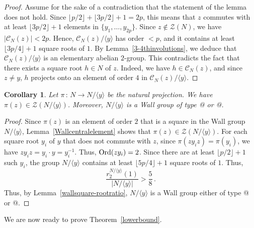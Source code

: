 \documentclass[12pt]{amsart}
\makeatletter
\numberwithin{equation}{section}
\newcommand*{\rom}[1]{\expandafter\@slowromancap\romannumeral #1@}
\newcommand{\Ord}{{\rm Ord}}
\newtheorem{cor}[X]{Corollary}
\theoremstyle{definition}
\theoremstyle{remark}
\makeatother
\begin{document}
\begin{proof}
    Assume for the sake of a contradiction that the statement of the lemma does not hold. Since $\lfloor p/2\rfloor+\lfloor 3p/2\rfloor+1=2p$, this means that $z$ commutes with at least $\lfloor 3p/2\rfloor+1$ elements in $\{y_1,\dots,y_{2p}\}$. Since $z\notin\mathcal{Z}(N)$, we have $|\mathcal{C}_N(z)|<2p$. Hence, $\mathcal{C}_N(z)/\langle y\rangle$ has order $<p$, and it contains at least $\lfloor 3p/4\rfloor+1$ square roots of $1$. By Lemma~\ref{3-4thinvolutions}, we deduce that $\mathcal{C}_N(z)/\langle y\rangle$ is an elementary abelian $2$-group. This contradicts the fact that there exists a square root $h\in N$ of $z$. Indeed, we have $h\in \mathcal{C}_N(z)$, and since $z\ne y$, $h$ projects onto an element of order $4$ in $\mathcal{C}_N(z)/\langle y\rangle$.
\end{proof}
\begin{cor}\label{FinalstructureN/y}
    Let $\pi\, \colon\,  N\to N/\langle y\rangle$ be the natural projection. We have $\pi(z)\in \mathcal{Z}(N/\langle y\rangle)$. Moreover, $N/\langle y\rangle$ is a Wall group of type \rom{1} or \rom{3}.
\end{cor}
\begin{proof}
    Since $\pi(z)$ is an element of order $2$ that is a square in the Wall group $N/\langle y\rangle$, Lemma~\ref{Wallcentralelement} shows that $\pi(z)\in \mathcal{Z}(N/\langle y\rangle )$. For each square root $y_i$ of $y$ that does not commute with $z$, since $\pi(zy_iz)=\pi(y_i)$, we have $zy_iz=y_i\cdot y=y_i^{-1}$. Thus, $\Ord(zy_i)=2$. Since there are at least $\lfloor p/2\rfloor+1$ such $y_i$, the group $N/\langle y \rangle $ contains at least $\lfloor 5p/4\rfloor+1$ square roots of $1$. Thus, \[\frac{r_2^{N/\langle y\rangle}(1)}{|N/\langle y\rangle|}>\frac{5}{8}\, .\]
    Thus, by Lemma~\ref{wallsquare-rootratio}, $N/\langle y\rangle$ is a Wall group either of type \rom{1} or \rom{3}.
\end{proof}
We are now ready to prove Theorem~\ref{lowerbound}.
\end{document}

